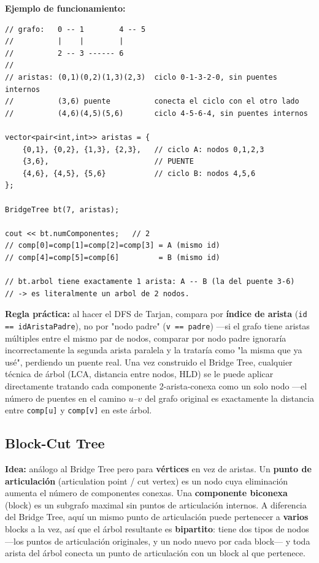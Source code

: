 \documentclass[10pt,a4paper,twocolumn]{article}
\begin{document}
\textbf{Ejemplo de funcionamiento:}

\begin{lstlisting}[style=cpp]
// grafo:   0 -- 1        4 -- 5
//          |    |        |
//          2 -- 3 ------ 6
//
// aristas: (0,1)(0,2)(1,3)(2,3)  ciclo 0-1-3-2-0, sin puentes internos
//          (3,6) puente          conecta el ciclo con el otro lado
//          (4,6)(4,5)(5,6)       ciclo 4-5-6-4, sin puentes internos

vector<pair<int,int>> aristas = {
    {0,1}, {0,2}, {1,3}, {2,3},   // ciclo A: nodos 0,1,2,3
    {3,6},                        // PUENTE
    {4,6}, {4,5}, {5,6}           // ciclo B: nodos 4,5,6
};

BridgeTree bt(7, aristas);

cout << bt.numComponentes;   // 2
// comp[0]=comp[1]=comp[2]=comp[3] = A (mismo id)
// comp[4]=comp[5]=comp[6]         = B (mismo id)

// bt.arbol tiene exactamente 1 arista: A -- B (la del puente 3-6)
// -> es literalmente un arbol de 2 nodos.
\end{lstlisting}

\textbf{Regla práctica:} al hacer el DFS de Tarjan, compara por
\textbf{índice de arista} (\texttt{id == idAristaPadre}), no por
"nodo padre" (\texttt{v == padre}) —si el grafo tiene aristas
múltiples entre el mismo par de nodos, comparar por nodo padre
ignoraría incorrectamente la segunda arista paralela y la trataría
como "la misma que ya usé", perdiendo un puente real. Una vez
construido el Bridge Tree, cualquier técnica de árbol (LCA,
distancia entre nodos, HLD) se le puede aplicar directamente
tratando cada componente 2-arista-conexa como un solo nodo —el
número de puentes en el camino $u$--$v$ del grafo original es
exactamente la distancia entre \texttt{comp[u]} y \texttt{comp[v]}
en este árbol.


\subsection{Block-Cut Tree}

\textbf{Idea:} análogo al Bridge Tree pero para \textbf{vértices} en
vez de aristas. Un \textbf{punto de articulación} (articulation
point / cut vertex) es un nodo cuya eliminación aumenta el número de
componentes conexas. Una \textbf{componente biconexa} (block) es un
subgrafo maximal sin puntos de articulación internos. A diferencia
del Bridge Tree, aquí un mismo punto de articulación puede pertenecer
a \textbf{varios} blocks a la vez, así que el árbol resultante es
\textbf{bipartito}: tiene dos tipos de nodos —los puntos de
articulación originales, y un nodo nuevo por cada block— y toda
arista del árbol conecta un punto de articulación con un block al
que pertenece.
\end{document}
